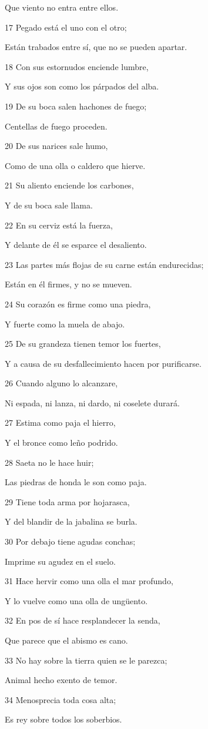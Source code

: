 \par Que viento no entra entre ellos.
\par 17 Pegado está el uno con el otro;
\par Están trabados entre sí, que no se pueden apartar.
\par 18 Con sus estornudos enciende lumbre,
\par Y sus ojos son como los párpados del alba.
\par 19 De su boca salen hachones de fuego;
\par Centellas de fuego proceden.
\par 20 De sus narices sale humo,
\par Como de una olla o caldero que hierve. 
\par 21 Su aliento enciende los carbones,
\par Y de su boca sale llama.
\par 22 En su cerviz está la fuerza,
\par Y delante de él se esparce el desaliento.
\par 23 Las partes más flojas de su carne están endurecidas;
\par Están en él firmes, y no se mueven.
\par 24 Su corazón es firme como una piedra,
\par Y fuerte como la muela de abajo.
\par 25 De su grandeza tienen temor los fuertes,
\par Y a causa de su desfallecimiento hacen por purificarse. 
\par 26 Cuando alguno lo alcanzare,
\par Ni espada, ni lanza, ni dardo, ni coselete durará.
\par 27 Estima como paja el hierro,
\par Y el bronce como leño podrido.
\par 28 Saeta no le hace huir;
\par Las piedras de honda le son como paja.
\par 29 Tiene toda arma por hojarasca,
\par Y del blandir de la jabalina se burla.
\par 30 Por debajo tiene agudas conchas;
\par Imprime su agudez en el suelo.
\par 31 Hace hervir como una olla el mar profundo,
\par Y lo vuelve como una olla de ungüento.
\par 32 En pos de sí hace resplandecer la senda, 
\par Que parece que el abismo es cano.
\par 33 No hay sobre la tierra quien se le parezca;
\par Animal hecho exento de temor.
\par 34 Menosprecia toda cosa alta;
\par Es rey sobre todos los soberbios.

